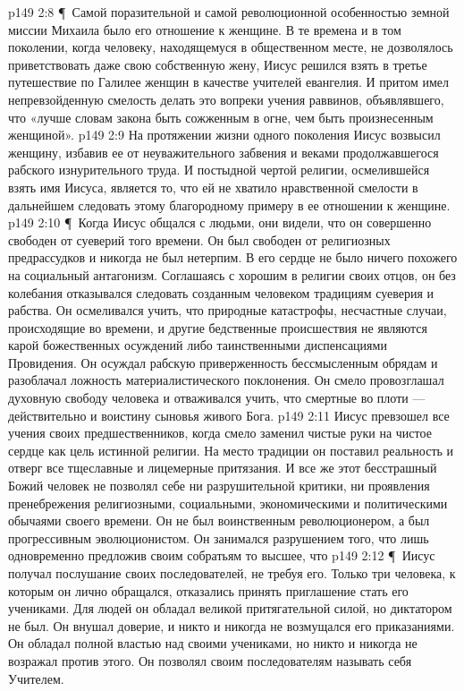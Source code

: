 \vs p149 2:8 \P\ Самой поразительной и самой революционной особенностью земной миссии Михаила было его отношение к женщине. В те времена и в том поколении, когда человеку, находящемуся в общественном месте, не дозволялось приветствовать даже свою собственную жену, Иисус решился взять в третье путешествие по Галилее женщин в качестве учителей евангелия. И притом имел непревзойденную смелость делать это вопреки учения раввинов, объявлявшего, что «лучше словам закона быть сожженным в огне, чем быть произнесенным женщиной».
\vs p149 2:9 На протяжении жизни одного поколения Иисус возвысил женщину, избавив ее от неуважительного забвения и веками продолжавшегося рабского изнурительного труда. И постыдной чертой религии, осмелившейся взять имя Иисуса, является то, что ей не хватило нравственной смелости в дальнейшем следовать этому благородному примеру в ее отношении к женщине.
\vs p149 2:10 \P\ Когда Иисус общался с людьми, они видели, что он совершенно свободен от суеверий того времени. Он был свободен от религиозных предрассудков и никогда не был нетерпим. В его сердце не было ничего похожего на социальный антагонизм. Соглашаясь с хорошим в религии своих отцов, он без колебания отказывался следовать созданным человеком традициям суеверия и рабства. Он осмеливался учить, что природные катастрофы, несчастные случаи, происходящие во времени, и другие бедственные происшествия не являются карой божественных осуждений либо таинственными диспенсациями Провидения. Он осуждал рабскую приверженность бессмысленным обрядам и разоблачал ложность материалистического поклонения. Он смело провозглашал духовную свободу человека и отваживался учить, что смертные во плоти --- действительно и воистину сыновья живого Бога.
\vs p149 2:11 Иисус превзошел все учения своих предшественников, когда смело заменил чистые руки на чистое сердце как цель истинной религии. На место традиции он поставил реальность и отверг все тщеславные и лицемерные притязания. И все же этот бесстрашный Божий человек не позволял себе ни разрушительной критики, ни проявления пренебрежения религиозными, социальными, экономическими и политическими обычаями своего времени. Он не был воинственным революционером, а был прогрессивным эволюционистом. Он занимался разрушением того, что  лишь одновременно предложив своим собратьям то высшее, что 
\vs p149 2:12 \P\ Иисус получал послушание своих последователей, не требуя его. Только три человека, к которым он лично обращался, отказались принять приглашение стать его учениками. Для людей он обладал великой притягательной силой, но диктатором не был. Он внушал доверие, и никто и никогда не возмущался его приказаниями. Он обладал полной властью над своими учениками, но никто и никогда не возражал против этого. Он позволял своим последователям называть себя Учителем.
